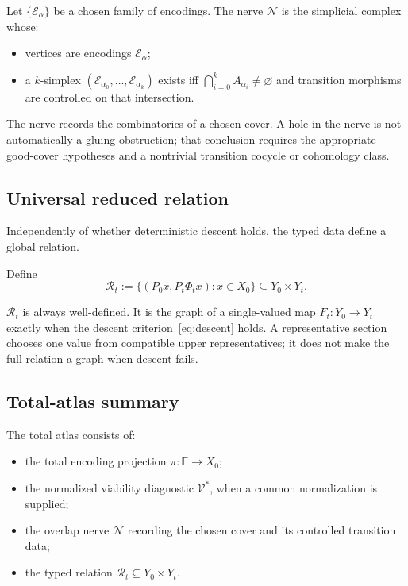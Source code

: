\documentclass[11pt]{article}
\theoremstyle{plain}
\theoremstyle{plain}
\begin{document}
\begin{definition}
Let $\{\mathcal{E}_\alpha\}$ be a chosen family of encodings.
The nerve $\mathcal{N}$ is the simplicial complex whose:
\begin{itemize}
\item vertices are encodings $\mathcal{E}_\alpha$;
\item a $k$-simplex $(\mathcal{E}_{\alpha_0},\dots,\mathcal{E}_{\alpha_k})$ exists
      iff $\bigcap_{i=0}^k A_{\alpha_i}\neq\varnothing$ and transition morphisms are
      controlled on that intersection.
\end{itemize}
\end{definition}

\begin{remark}
The nerve records the combinatorics of a chosen cover.  A hole in the nerve
is not automatically a gluing obstruction; that conclusion requires the
appropriate good-cover hypotheses and a nontrivial transition cocycle or
cohomology class.
\end{remark}

\subsection{Universal reduced relation}

Independently of whether deterministic descent holds, the typed data define a
global relation.

\begin{definition}
Define
\[
\mathcal{R}_t:=
\{(P_0x,P_t\Phi_tx):x\in X_0\}\subseteq Y_0\times Y_t.
\]
\end{definition}

\begin{remark}
$\mathcal{R}_t$ is always well-defined.  It is the graph of a single-valued
map $F_t:Y_0\to Y_t$ exactly when the descent
criterion~\eqref{eq:descent} holds.  A representative section chooses one
value from compatible upper representatives; it does not make the full
relation a graph when descent fails.
\end{remark}

\subsection{Total-atlas summary}

The total atlas consists of:
\begin{itemize}
\item the total encoding projection $\pi:\mathbb{E}\to X_0$;
\item the normalized viability diagnostic $\mathcal{V}^\ast$, when a common
normalization is supplied;
\item the overlap nerve $\mathcal{N}$ recording the chosen cover and its
controlled transition data;
\item the typed relation $\mathcal{R}_t\subseteq Y_0\times Y_t$.
\end{itemize}
\end{document}
